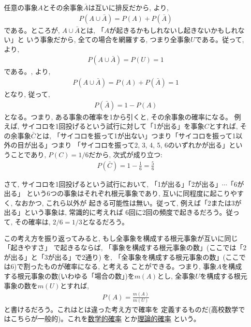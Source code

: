 任意の事象$A$とその余事象$\bar{A}$は互いに排反だから, より, 
\begin{eqnarray}P(A \cup \bar{A})=P(A)+P(\bar{A})\label{eq:stat_AcupAbar0}\end{eqnarray}
である。ところが, $A \cup \bar{A}$とは, 「$A$が起きるかもしれないし起きないかもしれない」と
いう事象だから, 全ての場合を網羅する, つまり全事象$U$である。従って, より, 
\begin{eqnarray}P(A \cup \bar{A})=P(U)=1\label{eq:stat_AcupAbar1}\end{eqnarray}
である。, より, 
\begin{eqnarray}P(A \cup \bar{A})=P(A)+P(\bar{A})=1\end{eqnarray}
となり, 従って, 
\begin{eqnarray}P(\bar{A})=1-P(A)\label{eq:yojisho_1_PA}\end{eqnarray}
となる。つまり, ある事象の確率を1から引くと, その余事象の確率になる。
例えば, サイコロを1回投げるという試行に対して「1が出る」を事象$C$とすれば, 
その余事象$\bar{C}$とは, 
「サイコロを振って1が出ない」つまり「サイコロを振って1以外の目が出る」つまり
「サイコロを振って2, 3, 4, 5, 6のいずれかが出る」ということであり, $P(C)=1/6$だから, 次式が成り立つ:
\begin{eqnarray}P(\bar{C})=1-\frac{1}{6}=\frac{5}{6}\end{eqnarray}

さて, サイコロを1回投げるという試行において, 「1が出る」「2が出る」$\cdots$「6が出る」
という6つの事象はそれぞれ根元事象であり, 互いに同程度に起こりやすく, なおかつ, これら以外が
起きる可能性は無い。従って, 例えば「2または3が出る」という事象は, 常識的に考えれば
6回に2回の頻度で起きるだろう。従って, その確率は, $2/6=1/3$となるだろう。

この考え方を振り返ってみると, もし全事象を構成する根元事象が互いに同じ「起きやすさ」
で起きるならば, 「事象を構成する根元事象の数」(ここでは「2が出る」と「3が出る」で2通り)
を, 「全事象を構成する根元事象の数」(ここでは6)で割ったものが確率になる, と考える
ことができる。つまり, 事象$A$を構成する根元事象の数(いわゆる「場合の数」)を$m(A)$とし, 
全事象$U$を構成する根元事象の数を$m(U)$とすれば, 
\begin{eqnarray}P(A)=\frac{m(A)}{m(U)}\label{eq:def_prob_math}\end{eqnarray}
と書けるだろう。これはとは違った考え方で確率を
定義するものだ(高校数学ではこちらが一般的)。これを\underline{数学的確率}
とか\underline{理論的確率}
という。

